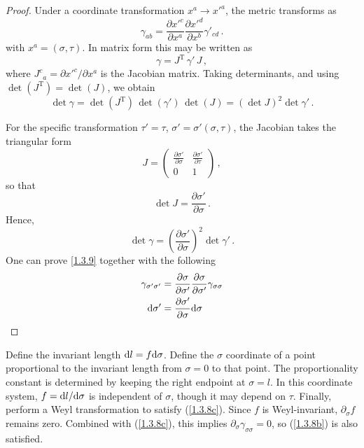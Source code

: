 \begin{tcolorbox}[breakable]
	\begin{proof}
		Under a coordinate transformation $x^a \to x'^a$, the metric transforms as
		\begin{equation}
			\gamma_{ab}
			= \frac{\partial x'^c}{\partial x^a}
			\frac{\partial x'^d}{\partial x^b}
			\gamma'_{cd} \, .
		\end{equation}
		with $x^a=(\sigma,\tau)$. In matrix form this may be written as
		\begin{equation}
			\gamma = J^{\mathrm T} \, \gamma' \, J \, ,
		\end{equation}
		where $J^c{}_a = \partial x'^c / \partial x^a$ is the Jacobian matrix. Taking determinants, and using $\det(J^{\mathrm T}) = \det(J)$, we obtain
		\begin{equation}
			\det \gamma 
			= \det(J^{\mathrm T}) \, \det(\gamma') \, \det(J)
			= (\det J)^2 \det \gamma' \, .
		\end{equation}
		
		For the specific transformation $\tau' = \tau$, $\sigma' = \sigma'(\sigma,\tau)$, the Jacobian takes the triangular form
		\begin{equation}
			J =
			\begin{pmatrix}
				\displaystyle \frac{\partial \sigma'}{\partial \sigma} & \displaystyle \frac{\partial \sigma'}{\partial \tau} \\
				0 & 1
			\end{pmatrix} \, ,
		\end{equation}
		so that
		\begin{equation}
			\det J = \frac{\partial \sigma'}{\partial \sigma} \, .
		\end{equation}
		Hence,
		\begin{equation}
			\det \gamma
			= \left(\frac{\partial \sigma'}{\partial \sigma}\right)^2 \det \gamma' \, .
		\end{equation}
		One can prove \eqref{1.3.9} together with the following
		\begin{align}
			\gamma_{\sigma'\sigma'}&=\pdv{\sigma}{\sigma'}\pdv{\sigma}{\sigma'}\gamma_{\sigma\sigma}\\
			\mathrm{d} \sigma'&=\pdv{\sigma'}{\sigma}\mathrm{d} \sigma
		\end{align}
	\end{proof}
\end{tcolorbox}
Define the invariant length $\mathrm{d} l=f\mathrm{d} \sigma$. Define the $\sigma$ coordinate of a point proportional to the invariant length from $\sigma=0$ to that point. The proportionality constant is determined by keeping the right endpoint at $\sigma=l$. In this coordinate system, $f=\mathrm{d} l/\mathrm{d} \sigma$ is independent of $\sigma$, though it may depend on $\tau$. 
Finally, perform a Weyl transformation to satisfy (\ref{1.3.8c}). Since $f$ is Weyl-invariant, $\partial_\sigma f$ remains zero. Combined with (\ref{1.3.8c}), this implies $\partial_{\sigma} \gamma_{\sigma \sigma}=0$, so (\ref{1.3.8b}) is also satisfied. 

